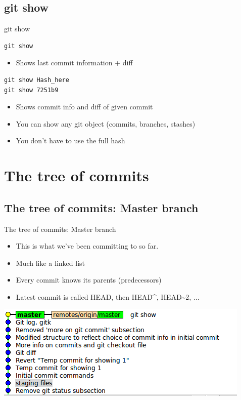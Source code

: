 \documentclass[10pt,a4paper]{beamer}
\begin{document}
\subsection{git show}
\begin{frame}[fragile]{git show}
\begin{verbatim}
git show
\end{verbatim}
\begin{itemize}
\item Shows last commit information + diff
\end{itemize}

\begin{verbatim}
git show Hash_here
git show 7251b9
\end{verbatim}
\begin{itemize}
\item Shows commit info and diff of given commit
\item You can show any git object (commits, branches, stashes)
\item You don't have to use the full hash
\end{itemize}
\end{frame}


\section{The tree of commits}

\subsection{The tree of commits: Master branch}
\begin{frame}{The tree of commits: Master branch}
\begin{itemize}
\item This is what we've been committing to so far.
\item Much like a linked list
\item Every commit knows its parents (predecessors)
\item Latest commit is called HEAD, then HEAD\^{}, HEAD\~{}2, ...
\end{itemize}
\includegraphics[width=\linewidth]{masterbranch.png}
\end{frame}
\end{document}
